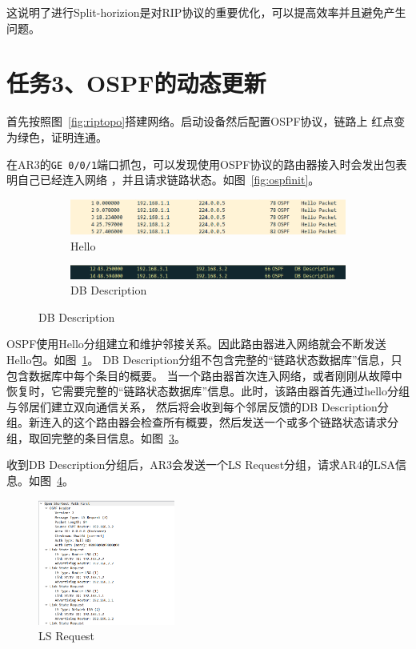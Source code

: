 \documentclass[a4paper,twoside]{article}
\begin{document}
\begin{spacing}{1.2}
这说明了进行Split-horizion是对RIP协议的重要优化，可以提高效率并且避免产生问题。

\section{任务3、OSPF的动态更新}

首先按照图~\ref{fig:riptopo}搭建网络。启动设备然后配置OSPF协议，链路上
红点变为绿色，证明连通。

在AR3的\texttt{GE 0/0/1}端口抓包，可以发现使用OSPF协议的路由器接入时会发出包表明自己已经连入网络
，并且请求链路状态。如图~\ref{fig:ospfinit}。
\begin{figure}[H]
	\centering
	\caption{OSPF启动}
	\label{fig:ospfinit}
	\begin{subfigure}{0.4\textwidth}
		\centering
		\includegraphics[width=\textwidth]{hello.png}
		\caption{Hello}
		\label{fig:hello}
	\end{subfigure}
	\begin{subfigure}{0.4\textwidth}
		\centering
		\includegraphics[width=\textwidth]{dbd.png} 
		\caption{DB Description}
		\label{fig:dbdesc}
	\end{subfigure}
\end{figure}

OSPF使用Hello分组建立和维护邻接关系。因此路由器进入网络就会不断发送Hello包。如图~\ref{fig:hello}。
DB Description分组不包含完整的“链路状态数据库”信息，只包含数据库中每个条目的概要。
当一个路由器首次连入网络，或者刚刚从故障中恢复时，它需要完整的“链路状态数据库”信息。此时，该路由器首先通过hello分组与邻居们建立双向通信关系，
然后将会收到每个邻居反馈的DB Description分组。新连入的这个路由器会检查所有概要，然后发送一个或多个链路状态请求分组，取回完整的条目信息。如图~\ref{fig:dbdesc}。

收到DB Description分组后，AR3会发送一个LS Request分组，请求AR4的LSA信息。如图~\ref{fig:lsreq}。
\begin{figure}[htb]
	\centering
	\caption{LS Request}
	\label{fig:lsreq}
	\includegraphics[width=0.4\textwidth]{lsreq.png}
\end{figure}


\end{spacing}
\end{document}

